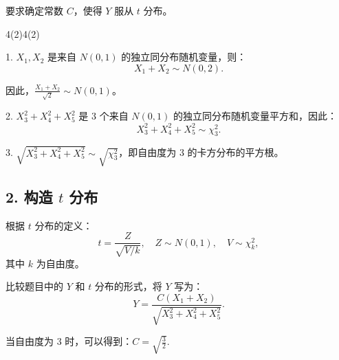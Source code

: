 \documentclass[twoside]{article}
\begin{document}
要求确定常数 \( C \)，使得 \( Y \) 服从 \( t \) 分布。

\begin{ans}{4(2)}{4(2)}

1. \( X_1, X_2 \) 是来自 \( N(0, 1) \) 的独立同分布随机变量，则：
\[
X_1 + X_2 \sim N(0, 2).
\]

因此，\( \frac{X_1 + X_2}{\sqrt{2}} \sim N(0, 1) \)。

2. \( X_3^2 + X_4^2 + X_5^2 \) 是 3 个来自 \( N(0, 1) \) 的独立同分布随机变量平方和，因此：
\[
X_3^2 + X_4^2 + X_5^2 \sim \chi_3^2.
\]

3. \( \sqrt{X_3^2 + X_4^2 + X_5^2} \sim \sqrt{\chi_3^2} \)，即自由度为 3 的卡方分布的平方根。

\subsection*{2. 构造 \( t \) 分布}

根据 \( t \) 分布的定义：
\[
t = \frac{Z}{\sqrt{V / k}}, \quad Z \sim N(0, 1), \quad V \sim \chi_k^2,
\]
其中 \( k \) 为自由度。

比较题目中的 \( Y \) 和 \( t \) 分布的形式，将 \( Y \) 写为：
\[
Y = \frac{C (X_1 + X_2)}{\sqrt{X_3^2 + X_4^2 + X_5^2}}.
\]

当自由度为 3 时，可以得到：$C = \sqrt{\frac{3}{2}} $.
\end{ans}
\end{document}
